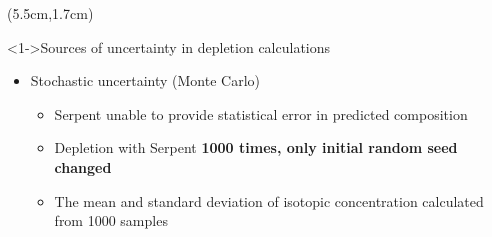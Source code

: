 \begin{frame}
\begin{textblock*}{12.4cm}
\begin{columns}
		\column[t]{6cm}
		\begin{textblock*}{7.2cm}(5.5cm,1.7cm) %
			\begin{block}<1->{Sources of uncertainty in depletion calculations}
			\begin{itemize}
				\itemsep=0.3em
				\item<2-> Stochastic uncertainty (Monte Carlo)
				\begin{itemize}
					\itemsep=0.5em
					\item Serpent unable to provide statistical error in 
					predicted composition
					\item Depletion with Serpent \textbf{1000 times, only 
					initial random seed changed}
					\item The mean and standard deviation of isotopic 
					concentration calculated from 1000 samples
				\end{itemize}
				
			\end{itemize}
			\end{block}
			
		\end{textblock*}

	\end{columns}
\end{textblock*}
\end{frame}

